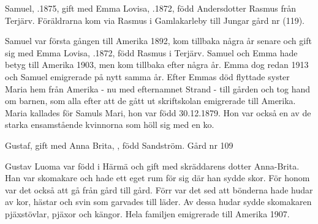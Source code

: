 Samuel, .1875, gift med Emma Lovisa, .1872, född Andersdotter Rasmus från Terjärv. Föräldrarna kom via Rasmus i Gamlakarleby till Jungar gård nr (119).
\begin{jhchildren}
  \item {}
  \item {}
  \item {}
  \item {}
  \item {}
  \item {}
\end{jhchildren}
Samuel var första gången till Amerika 1892, kom tillbaka några år senare och gift sig med Emma Lovisa, .1872, född Rasmus i Terjärv. Samuel och Emma hade betyg till Amerika 1903, men kom tillbaka efter några år. Emma dog redan 1913 och Samuel emigrerade på nytt samma år. Efter Emmas död flyttade syster Maria hem från Amerika - nu med efternamnet Strand - till gården och tog hand om barnen, som alla	efter att de gått ut skriftskolan emigrerade till Amerika. Maria kallades för Samuls Mari, hon var född 30.12.1879. Hon var också en av de starka ensamstående kvinnorna som höll sig med en ko.


Gustaf,  gift med Anna Brita, , född Sandström. Gård nr 109
\begin{jhchildren}
  \item {}
  \item {}
  \item {}
  \item {}
  \item {}
  \item {}
  \item {}
  \item {}
  \item {}
\end{jhchildren}
Gustav Luoma var född i Härmä och gift med skräddarens dotter Anna-Brita. Han var skomakare och hade ett eget rum för sig där han sydde skor. För honom var det också att gå från gård till gård. Förr var det sed att bönderna hade hudar av kor, hästar och svin som garvades till läder. Av dessa hudar sydde skomakaren pjäxstövlar, pjäxor och kängor. Hela familjen emigrerade till Amerika 1907.



